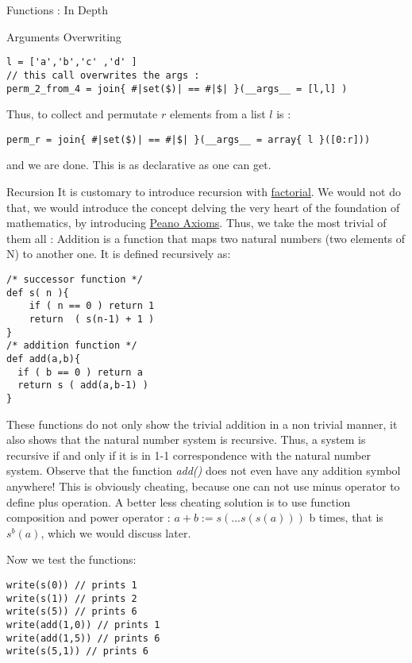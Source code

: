\begin{section}{Functions : In Depth}
\begin{subsection}{Arguments Overwriting}
\begin{lstlisting}[style=JexlStyle]
l = ['a','b','c' ,'d' ]
// this call overwrites the args :
perm_2_from_4 = join{ #|set($)| == #|$| }(__args__ = [l,l] )
\end{lstlisting}

Thus, to collect and permutate $r$ elements from a list $l$ is :
 
\begin{lstlisting}[style=JexlStyle]
perm_r = join{ #|set($)| == #|$| }(__args__ = array{ l }([0:r]))
\end{lstlisting}

and we are done. This is as declarative as one can get.

\end{subsection}

\begin{subsection}{Recursion}
It is customary to introduce recursion with \href{https://en.wikipedia.org/wiki/Factorial}{factorial}.
We would not do that, we would introduce the concept delving the very heart of the foundation of mathematics, 
by introducing \href{https://en.wikipedia.org/wiki/Peano_axioms}{Peano Axioms}.
Thus, we take the most trivial of them all : Addition is a function that maps two natural numbers (two elements of N) to another one. 
It is defined recursively as:

\begin{lstlisting}[style=JexlStyle]
/* successor function */
def s( n ){
    if ( n == 0 ) return 1 
    return  ( s(n-1) + 1 )  
}
/* addition function */
def add(a,b){
  if ( b == 0 ) return a
  return s ( add(a,b-1) )
}
\end{lstlisting}

These functions do not only show the trivial addition in a non trivial manner, 
it also shows that the natural number system is recursive.
Thus, a system is recursive if and only if it is in 1-1 correspondence with the natural number system.
Observe that the function \emph{add()} does not even have any addition symbol anywhere!
This is obviously cheating, because one can not use minus operator to define plus operation.
A better less cheating solution is to use function composition and power operator :
$a+b := s(...s(s(a)))$ b times, that is $s^b(a)$, which we would discuss later.

Now we test the functions:

\begin{center}\begin{minipage}{\linewidth}
\begin{lstlisting}[style=JexlStyle]
write(s(0)) // prints 1 
write(s(1)) // prints 2
write(s(5)) // prints 6
write(add(1,0)) // prints 1
write(add(1,5)) // prints 6
write(s(5,1)) // prints 6
\end{lstlisting}
\end{minipage}\end{center}


\end{subsection}
\end{section}
